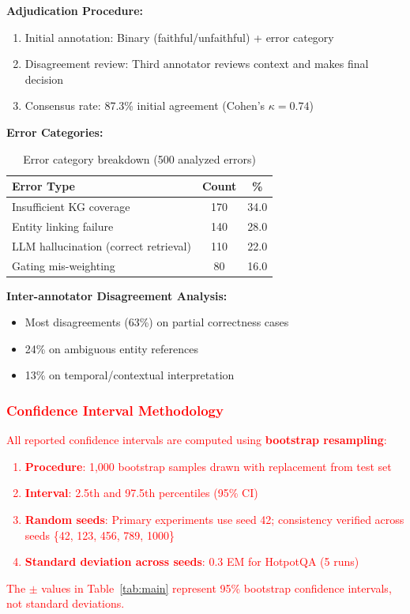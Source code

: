 \documentclass[10pt,twocolumn]{article}
\newcommand{\revisioncritical}[1]{\textcolor{red}{#1}}
\begin{document}
\textbf{Adjudication Procedure:}
\begin{enumerate}
    \item Initial annotation: Binary (faithful/unfaithful) + error category
    \item Disagreement review: Third annotator reviews context and makes final decision
    \item Consensus rate: 87.3\% initial agreement (Cohen's $\kappa = 0.74$)
\end{enumerate}

\textbf{Error Categories:}
\begin{table}[h]
\centering
\caption{Error category breakdown (500 analyzed errors)}
\label{tab:error_categories}
\small
\begin{tabular}{@{}lcc@{}}
\toprule
\textbf{Error Type} & \textbf{Count} & \textbf{\%} \\
\midrule
Insufficient KG coverage & 170 & 34.0 \\
Entity linking failure & 140 & 28.0 \\
LLM hallucination (correct retrieval) & 110 & 22.0 \\
Gating mis-weighting & 80 & 16.0 \\
\bottomrule
\end{tabular}
\end{table}

\textbf{Inter-annotator Disagreement Analysis:}
\begin{itemize}
    \item Most disagreements (63\%) on partial correctness cases
    \item 24\% on ambiguous entity references
    \item 13\% on temporal/contextual interpretation
\end{itemize}

\revisioncritical{
\subsubsection{Confidence Interval Methodology}
\label{sec:confidence_intervals}

All reported confidence intervals are computed using \textbf{bootstrap resampling}:

\begin{enumerate}
    \item \textbf{Procedure}: 1,000 bootstrap samples drawn with replacement from test set
    \item \textbf{Interval}: 2.5th and 97.5th percentiles (95\% CI)
    \item \textbf{Random seeds}: Primary experiments use seed 42; consistency verified across seeds \{42, 123, 456, 789, 1000\}
    \item \textbf{Standard deviation across seeds}: 0.3 EM for HotpotQA (5 runs)
\end{enumerate}

The $\pm$ values in Table~\ref{tab:main} represent 95\% bootstrap confidence intervals, not standard deviations.
}
\end{document}
